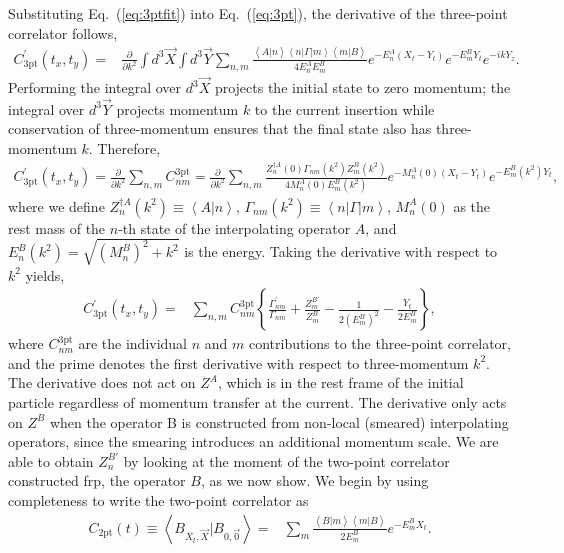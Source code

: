 \documentclass{PoS}
\newcommand{\dgr}[1]{\textcolor{David}{#1}}
\begin{document}
Substituting Eq.~(\ref{eq:3ptfit}) into Eq.~(\ref{eq:3pt}), the
derivative of the three-point correlator follows,
\begin{align}
C^\prime_{\text{3pt}}(t_x, t_y) = & \frac{\partial}{\partial k^2} \int
d^3\vec{X} \int d^3\vec{Y} \sum_{n,m} \frac{\left<A | n\right>\left<n|
  \Gamma |m\right>\left<m | B\right>}{4E^A_n E^B_m} e^{-E^A_n(X_t -
  Y_t)} e^{-E^B_m Y_t} e^{-ikY_z}.
\end{align}
Performing the integral over $d^3\vec{X}$ projects the initial state
to zero momentum; the integral over $d^3 \vec{Y}$ projects momentum
$k$ to the current insertion while conservation of three-momentum
ensures that the final state also has three-momentum $k$. Therefore,
\begin{align}
C^\prime_{\text{3pt}}(t_x, t_y) = \frac{\partial}{\partial k^2}
\sum_{n,m} C_{nm}^{\text{3pt}} = \frac{\partial}{\partial k^2}
\sum_{n,m} \frac{Z_n^{\dagger A}(0) \Gamma_{nm}(k^2)Z_m^B(k^2)}{4
  M^A_n(0) E^B_m(k^2)} e^{-M^A_n(0)(X_t - Y_t)} e^{-E^B_m(k^2) Y_t},
\end{align}
where we define $Z_n^{\dagger A}(k^2) \equiv\left<A|n\right>$,
$\Gamma_{nm}(k^2) \equiv \left<n| \Gamma | m \right>$, $M_n^A(0)$ as
the rest mass of the $n$-th state of the interpolating operator $A$,
and \dgr{$E_n^B(k^2) = \sqrt{(M_n^B)^2+k^2}$} is the energy. Taking
the derivative with respect to $k^2$ yields,
\begin{align}
C^\prime_{\text{3pt}}(t_x, t_y) = &\sum_{n,m} C^{\text{3pt}}_{nm}\left\{ \frac{\Gamma_{nm}^\prime}{\Gamma_{nm}} + \frac{Z^{B\prime}_m}{Z^B_m} - \frac{1}{2(E_m^B)^2} -\frac{Y_t}{2E^B_m}\right\} \label{3ptmomentfit},
\end{align}
where $C_{nm}^{\text{3pt}}$ are the individual $n$ and $m$
contributions to the three-point correlator, and the prime denotes the
first derivative with respect to three-momentum $k^2$. The derivative
does not act on $Z^A$, which is in the rest frame of the initial
particle regardless of momentum transfer at the current. The
derivative only acts on $Z^B$ when \dgr{the operator B} is constructed from non-local
(smeared) interpolating operators, \dgr{since the smearing introduces an additional momentum
  scale}.
\dgr{We are able to obtain $Z^{B\prime}_n$ by looking at the moment of
  the two-point correlator constructed frp, the operator $B$, as we now show.
We begin by using completeness to write the two-point correlator as}
\begin{align}
C_{\text{2pt}}(t) \equiv \left<B_{X_t,\vec{X}} | B_{0,\vec{0}}\right> = & \sum_m \frac{\left<B | m\right>\left<m | B\right>}{2E_m^B} e^{-E_m^B X_t} \label{eq:2ptfit}.
\end{align}
\end{document}
